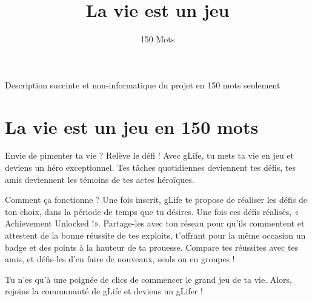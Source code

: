 \documentclass{life-fr}
\begin{document}
\title{La vie est un jeu}
\subtitle{150 Mots}

\summary
{
  Description succinte et non-informatique du projet en 150 mots seulement
}

\maketitle


\chapter{La vie est un jeu en 150 mots}

Envie de pimenter ta vie ? Relève le défi ! Avec gLife, tu mets ta vie en jeu et deviens un héro exceptionnel.
Tes tâches quotidiennes deviennent tes défis, tes amis deviennent les témoins de tes actes héroïques.

Comment ça fonctionne ? Une fois inscrit, gLife te propose de réaliser les défis de ton choix,
dans la période de temps que tu désires. Une fois ces défis réalisés,
« Achievement Unlocked !». Partage-les avec ton réseau pour qu’ils commentent et attestent
de la bonne réussite de tes exploits, t’offrant pour la même occasion un badge et des points
à la hauteur de ta prouesse. Compare tes réussites avec tes amis,
et défis-les d’en faire de nouveaux, seuls ou en groupes !

Tu n’es qu’à une poignée de clics de commencer le grand jeu de ta vie.
Alors, rejoins la communauté de gLife et deviens un gLifer !
\end{document}
